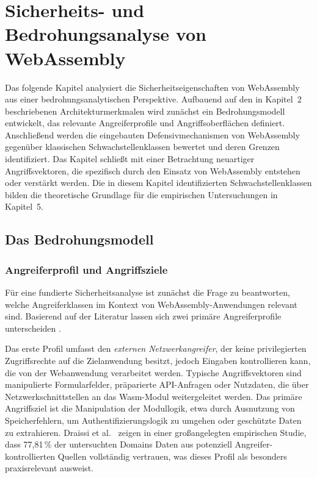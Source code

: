 \clearpage

\section{Sicherheits- und Bedrohungsanalyse von WebAssembly}

Das folgende Kapitel analysiert die Sicherheitseigenschaften von WebAssembly aus einer bedrohungsanalytischen Perspektive. Aufbauend auf den in Kapitel~2 beschriebenen Architekturmerkmalen wird zunächst ein Bedrohungsmodell entwickelt, das relevante Angreiferprofile und Angriffsoberflächen definiert. Anschließend werden die eingebauten Defensivmechanismen von WebAssembly gegenüber klassischen Schwachstellenklassen bewertet und deren Grenzen identifiziert. Das Kapitel schließt mit einer Betrachtung neuartiger Angriffsvektoren, die spezifisch durch den Einsatz von WebAssembly entstehen oder verstärkt werden. Die in diesem Kapitel identifizierten Schwachstellenklassen bilden die theoretische Grundlage für die empirischen Untersuchungen in Kapitel~5.

\subsection{Das Bedrohungsmodell}

\subsubsection{Angreiferprofil und Angriffsziele}

Für eine fundierte Sicherheitsanalyse ist zunächst die Frage zu beantworten, welche Angreiferklassen im Kontext von WebAssembly-Anwendungen relevant sind. Basierend auf der Literatur lassen sich zwei primäre Angreiferprofile unterscheiden \cite{PERRONE2025100728,2023-30049}.

Das erste Profil umfasst den \textit{externen Netzwerkangreifer}, der keine privilegierten Zugriffsrechte auf die Zielanwendung besitzt, jedoch Eingaben kontrollieren kann, die von der Webanwendung verarbeitet werden. Typische Angriffsvektoren sind manipulierte Formularfelder, präparierte API-Anfragen oder Nutzdaten, die über Netzwerkschnittstellen an das Wasm-Modul weitergeleitet werden. Das primäre Angriffsziel ist die Manipulation der Modullogik, etwa durch Ausnutzung von Speicherfehlern, um Authentifizierungslogik zu umgehen oder geschützte Daten zu extrahieren. Draissi et al.~\cite{10.1145/3728937} zeigen in einer großangelegten empirischen Studie, dass 77{,}81\,\% der untersuchten Domains Daten aus potenziell Angreifer-kontrollierten Quellen vollständig vertrauen, was dieses Profil als besonders praxisrelevant ausweist.

